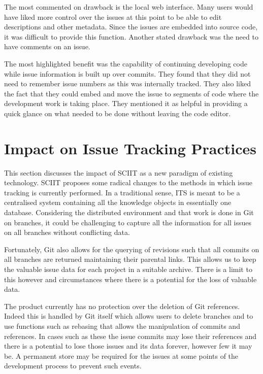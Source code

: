 \documentclass{mproj}
\begin{document}
The most commented on drawback is the local web interface. Many users would have liked more control over the issues at this point to be able to edit descriptions and other metadata. Since the issues are embedded into source code, it was difficult to provide this function. Another stated drawback was the need to have comments on an issue.

The most highlighted benefit was the capability of continuing developing code while issue information is built up over commits. They found that they did not need to remember issue numbers as this was internally tracked. They also liked the fact that they could embed and move the issue to segments of code where the development work is taking place. They mentioned it as helpful in providing a quick glance on what needed to be done without leaving the code editor.



\section{Impact on Issue Tracking Practices}

This section discusses the impact of SCIIT as a new paradigm of existing technology. SCIIT proposes some radical changes to the methods in which issue tracking is currently performed. In a traditional sense, ITS is meant to be a centralised system containing all the knowledge objects in essentially one database. Considering the distributed environment and that work is done in Git on branches, it could be challenging to capture all the information for all issues on all branches without conflicting data.

Fortunately, Git also allows for the querying of revisions such that all commits on all branches are returned maintaining their parental links. This allows us to keep the valuable issue data for each project in a suitable archive. There is a limit to this however and circumstances where there is a potential for the loss of valuable data.

The product currently has no protection over the deletion of Git references. Indeed this is handled by Git itself which allows users to delete branches and to use functions such as rebasing that allows the manipulation of commits and references. In cases such as these the issue commits may lose their references and there is a potential to lose those issues and its data forever, however few it may be. A permanent store may be required for the issues at some points of the development process to prevent such events.
\end{document}
